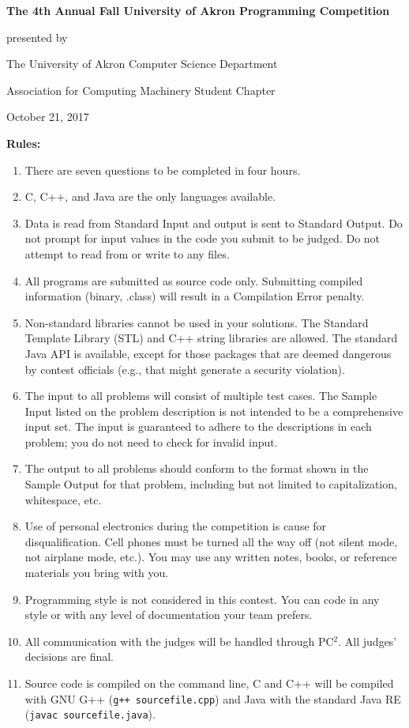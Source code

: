 \begin{center}
\large
\textbf{The 4th Annual Fall University of Akron Programming Competition}

\vspace{.25in}

presented by

The University of Akron Computer Science Department

Association for Computing Machinery Student Chapter

\vspace{.25in}

October 21, 2017
\end{center}

\textbf{Rules:}
\begin{enumerate} \itemsep10pt \parskip0pt 
\item There are seven questions to be completed in four hours.
\item C, C++, and Java are the only languages available.
\item Data is read from Standard Input and output is sent to Standard Output. Do not prompt for input values in the code you submit to be judged. Do not attempt to read from or write to any files.
\item All programs are submitted as source code only. Submitting compiled information (binary, .class) will result in a Compilation Error penalty.
\item Non-standard libraries cannot be used in your solutions. The Standard Template Library (STL) and C++ string libraries are allowed. The standard Java API is available, except for those packages that are deemed dangerous by contest officials (e.g., that might generate a security violation).
\item The input to all problems will consist of multiple test cases. The Sample Input listed on the problem description is not intended to be a comprehensive input set. The input is guaranteed to adhere to the descriptions in each problem; you do not need to check for invalid input.
\item The output to all problems should conform to the format shown in the Sample Output for that problem, including but not limited to capitalization, whitespace, etc.
\item Use of personal electronics during the competition is cause for disqualification. Cell phones must be turned all the way off (not silent mode, not airplane mode, etc.). You may use any written notes, books, or reference materials you bring with you.
\item Programming style is not considered in this contest. You can code in any style or with any level of documentation your team prefers.
\item All communication with the judges will be handled through PC$^2$. All judges’ decisions are final.
\item Source code is compiled on the command line, C and C++ will be compiled with GNU G++ (\texttt{g++ sourcefile.cpp}) and Java with the standard Java RE (\texttt{javac sourcefile.java}).
\end{enumerate}
